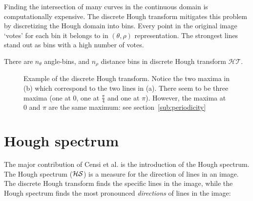 Finding the intersection of many curves in the continuous domain is computationally expensive. The discrete Hough transform mitigates this problem by discretizing the Hough domain into bins. Every point in the original image `votes' for each bin it belongs to in $(\theta, \rho)$ representation. The strongest lines stand out as bins with a high number of votes.

There are $n_\theta$ angle-bins, and $n_\rho$ distance bins in discrete Hough transform $\mathcal{HT}$. 

\begin{figure}[ht]
\centering
{}
\caption{Example of the discrete Hough transform. Notice the two maxima in (b) which correspond to the two lines in (a). There seem to be three maxima (one at $0$, one at $\frac{\pi}{4}$ and one at $\pi$). However, the maxima at $0$ and $\pi$ are the same maximum: see section~\ref{sub:periodicity}}
\label{fig:beehive}
\end{figure}


\section{Hough spectrum}
The major contribution of Censi et al.\cite{censi2005scan} is the introduction of the Hough spectrum. The Hough spectrum ($\cal HS$) is a measure for the direction of lines in an image. The discrete Hough transform finds the specific lines in the image, while the Hough spectrum finds the most pronounced \emph{directions} of lines in the image:

